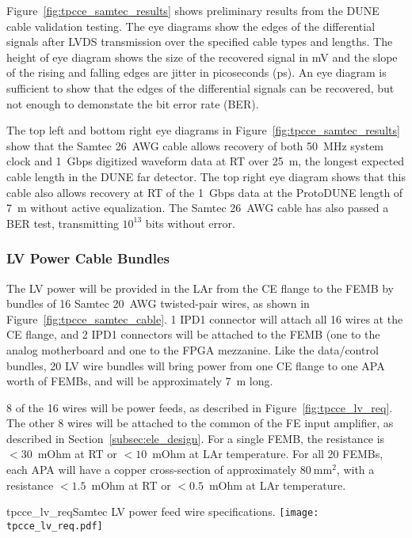 Figure~\ref{fig:tpcce_samtec_results} shows preliminary results from the DUNE cable 
validation testing. The eye diagrams show the edges of the differential signals after 
LVDS transmission over the specified cable types and lengths. The height of eye diagram shows the size 
of the recovered signal in mV and the slope of the rising and falling edges are jitter in picoseconds (ps). 
An eye diagram is sufficient to show that the edges of the differential signals can
be recovered, but not enough to demonstate the bit error rate (BER).

The top left and bottom right eye diagrams in Figure~\ref{fig:tpcce_samtec_results} show 
that the Samtec 26~AWG cable allows recovery of both 50~MHz system clock and 1~Gbps digitized waveform 
data at RT over 25~m, the longest expected cable length in the DUNE far detector. 
The top right eye diagram shows that this cable also allows recovery at RT of the 1~Gbps data 
at the ProtoDUNE length of 7~m without active equalization. 
The Samtec 26~AWG cable has 
also passed a BER test, transmitting $10^{13}$ bits without error.

\subsubsection{LV Power Cable Bundles}
\label{subsubsec:ce_lvpower_cable}

The LV power will be provided in the LAr from the CE flange to the FEMB by bundles of 16 Samtec 
20~AWG twisted-pair wires, as shown in Figure~\ref{fig:tpcce_samtec_cable}. 1 IPD1 connector will
attach all 16 wires at the CE flange, and 2 IPD1 connectors will be attached to the FEMB (one to the
analog motherboard and one to the FPGA mezzanine. Like the data/control bundles, 20 LV wire bundles 
will bring power from one CE flange to one APA worth of FEMBs, and will be approximately 7~m long.

8 of the 16 wires will be power feeds, as described in Figure~\ref{fig:tpcce_lv_req}. The other 8 wires
will be attached to the common of the FE input amplifier, as described in Section~\ref{subsec:ele_design}. For
a single FEMB, the resistance is $<30$~mOhm at RT or $<10$~mOhm at LAr temperature. For
all 20 FEMBs, each APA will have a copper cross-section of approximately $80~\mathrm{mm}^2$, with
a resistance $<1.5$~mOhm at RT or $<0.5$~mOhm at LAr temperature.

\begin{cdrfigure}{tpcce_lv_req}{Samtec LV power feed wire 
specifications.}
\texttt{[image: tpcce\_lv\_req.pdf]}
\end{cdrfigure}

